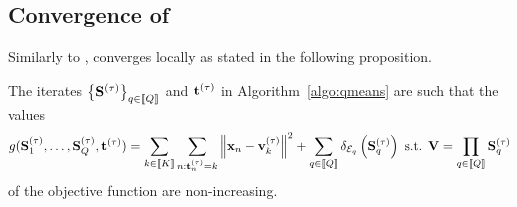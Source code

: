 %
%


\iffalse
\begin{remark}[Assignment/Re-estimation trade-off.]
A strategy to tackle this problem would be to first run the vanilla K-means algorithm,
 obtain the matrix of centroids $U$ and then encode $U$ as a product of sparse matrices
 using HierarchicalPalm4LED. This would however prevent us from taking advantage of 
 the expected low complexity product that plays a role in the assignement step of 
 the procedure.
\end{remark}

\todo[inline]{At some point, talk about the trade-off that we are playing with
regarding the cost of the assignment and the cost of the re-estimation procedure.}
\fi

\subsection{Convergence of \qkmeans}
Similarly to \kmeans, \qkmeans converges locally as stated in the following proposition.

\begin{proposition}
\label{thm:convergence}
The iterates $\left \lbrace{\mathbf{S}}^{(\tau)} \right \rbrace_{q\in\left \llbracket Q\right \rrbracket}$ and ${\mathbf{t}}^{(\tau)}$ in Algorithm~\ref{algo:qmeans} are such that the values
\begin{align}
\label{eq:qmean_problem_2}
    g({\mathbf{S}}_1^{(\tau)}, \ldots,{\mathbf{S}}_Q^{(\tau)}, {\mathbf{t}}^{(\tau)})
    = \sum_{k\in\left \llbracket K\right \rrbracket} \sum_{n: {\mathbf{t}}^{(\tau)}_n = k} \left \| {\mathbf{x}}_n - {\mathbf{v}}^{(\tau)}_k\right \|^2 + \sum_{q\in\left \llbracket Q\right \rrbracket} \delta_{\mathcal{E}_q}\left ({\mathbf{S}}_q^{(\tau)}\right )
    \text{ s.t. } {\mathbf{V}} = \prod_{q\in\left \llbracket Q\right \rrbracket}{{\mathbf{S}}_q^{(\tau)}}
\end{align}
of the objective function are non-increasing.
\end{proposition}




